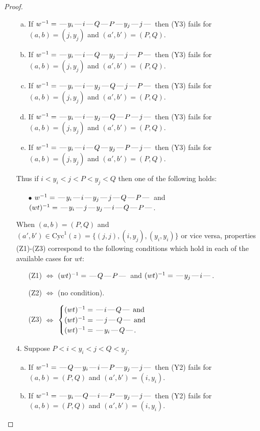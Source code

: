 \documentclass[10pt]{article}
\theoremstyle{definition}
\theoremstyle{definition}
\def\dash{\text{\hspace{0.5mm}---\hspace{0.5mm}}}
\def\Cyc{\mathrm{Cyc}}
\begin{document}
\begin{proof}
\begin{enumerate}
\begin{enumerate}[(a)]
\item If $w^{-1} = \dash y_i\dash i\dash Q\dash P\dash y_j\dash j\dash $ then (Y3) fails for $(a,b)=(j,y_j)$ and $(a',b')=(P,Q)$.
\item If $w^{-1} = \dash y_i\dash i\dash Q\dash y_j\dash j\dash P\dash $ then (Y3) fails for $(a,b)=(j,y_j)$ and $(a',b')=(P,Q)$.
\item If $w^{-1} = \dash y_i\dash i\dash y_j\dash Q\dash j\dash P\dash $ then (Y3) fails for $(a,b)=(j,y_j)$ and $(a',b')=(P,Q)$.
\item If $w^{-1} = \dash y_i\dash i\dash y_j\dash Q\dash P\dash j\dash $ then (Y3) fails for $(a,b)=(j,y_j)$ and $(a',b')=(P,Q)$.
\item If $w^{-1} = \dash y_i\dash i\dash Q\dash y_j\dash P\dash j\dash $ then (Y3) fails for $(a,b)=(j,y_j)$ and $(a',b')=(P,Q)$.
\end{enumerate}
Thus if $i < y_i < j < P < y_j < Q$ then one of the following holds:
\begin{enumerate}
\item[$\bullet$] $w^{-1} = \dash y_i\dash i\dash y_j\dash j\dash Q\dash P\dash $ and $(wt)^{-1} = \dash y_i\dash j\dash y_j\dash i\dash Q\dash P\dash $.
\end{enumerate}
When $(a,b)= (P,Q)$ and $(a',b')\in \Cyc^1(z)=\{(j,j),(i,y_j),(y_i,y_i)\}$ or vice versa,
properties (Z1)-(Z3) correspond to the following conditions which
hold in each of the available cases for $wt$:
\begin{enumerate}
\item[](Z1) $\Leftrightarrow$ $(wt)^{-1} = \dash Q \dash P \dash$  and $(wt)^{-1} = \dash y_j \dash i \dash$.
\item[](Z2) $\Leftrightarrow$ (no condition).
\item[](Z3) $\Leftrightarrow$ $\begin{cases}\text{$(wt)^{-1} = \dash i \dash Q \dash$}\text{ and }\\
\text{$(wt)^{-1} = \dash j \dash Q \dash$}\text{ and }\\
\text{$(wt)^{-1} = \dash y_i \dash Q \dash$}.\end{cases}$
\end{enumerate}
\item[$4$.] Suppose $P < i < y_i < j < Q < y_j$.
\begin{enumerate}[(a)]
\item If $w^{-1} = \dash Q\dash y_i\dash i\dash P\dash y_j\dash j\dash $ then (Y2) fails for $(a,b)=(P,Q)$ and $(a',b')=(i,y_i)$.
\item If $w^{-1} = \dash y_i\dash Q\dash i\dash P\dash y_j\dash j\dash $ then (Y2) fails for $(a,b)=(P,Q)$ and $(a',b')=(i,y_i)$.

\end{enumerate}
\end{enumerate}
\end{proof}
\end{document}
